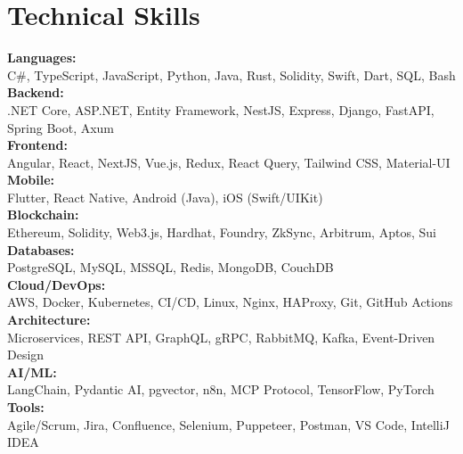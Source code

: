 \section{Technical Skills}
 \begin{itemize}[leftmargin=0.15in, label={}]
    \small{\item{
     \textbf{Languages:} \\
     \quad \textbullet{} C\#, TypeScript, JavaScript, Python, Java, Rust, Solidity, Swift, Dart, SQL, Bash \\ \vspace{2pt}
     \textbf{Backend:} \\
     \quad \textbullet{} .NET Core, ASP.NET, Entity Framework, NestJS, Express, Django, FastAPI, Spring Boot, Axum \\ \vspace{2pt}
     \textbf{Frontend:} \\
     \quad \textbullet{} Angular, React, NextJS, Vue.js, Redux, React Query, Tailwind CSS, Material-UI \\ \vspace{2pt}
     \textbf{Mobile:} \\
     \quad \textbullet{} Flutter, React Native, Android (Java), iOS (Swift/UIKit) \\ \vspace{2pt}
     \textbf{Blockchain:} \\
     \quad \textbullet{} Ethereum, Solidity, Web3.js, Hardhat, Foundry, ZkSync, Arbitrum, Aptos, Sui \\ \vspace{2pt}
     \textbf{Databases:} \\
     \quad \textbullet{} PostgreSQL, MySQL, MSSQL, Redis, MongoDB, CouchDB \\ \vspace{2pt}
     \textbf{Cloud/DevOps:} \\
     \quad \textbullet{} AWS, Docker, Kubernetes, CI/CD, Linux, Nginx, HAProxy, Git, GitHub Actions \\ \vspace{2pt}
     \textbf{Architecture:} \\
     \quad \textbullet{} Microservices, REST API, GraphQL, gRPC, RabbitMQ, Kafka, Event-Driven Design \\ \vspace{2pt}
     \textbf{AI/ML:} \\
     \quad \textbullet{} LangChain, Pydantic AI, pgvector, n8n, MCP Protocol, TensorFlow, PyTorch \\ \vspace{2pt}
     \textbf{Tools:} \\
     \quad \textbullet{} Agile/Scrum, Jira, Confluence, Selenium, Puppeteer, Postman, VS Code, IntelliJ IDEA
    }}
 \end{itemize}
